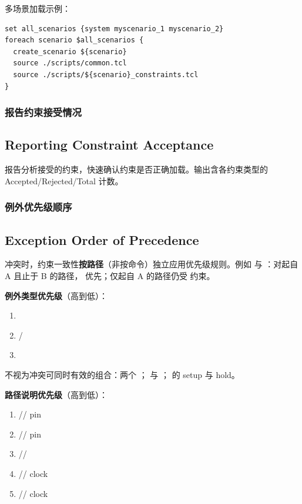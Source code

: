 多场景加载示例：
\begin{lstlisting}
set all_scenarios {system myscenario_1 myscenario_2}
foreach scenario $all_scenarios {
  create_scenario ${scenario}
  source ./scripts/common.tcl
  source ./scripts/${scenario}_constraints.tcl
}
\end{lstlisting}

\subsubsection{报告约束接受情况}
\subsection*{Reporting Constraint Acceptance}

 报告分析接受的约束，快速确认约束是否正确加载。输出含各约束类型的 Accepted/Rejected/Total 计数。

\subsubsection{例外优先级顺序}
\subsection*{Exception Order of Precedence}

冲突时，约束一致性\textbf{按路径}（非按命令）独立应用优先级规则。例如  与 ：对起自 A 且止于 B 的路径， 优先；仅起自 A 的路径仍受  约束。

\textbf{例外类型优先级}（高到低）：
\begin{enumerate}
  \item {}
  \item {} / 
  \item {}
\end{enumerate}

不视为冲突可同时有效的组合：两个 ； 与 ； 的 setup 与 hold。

\textbf{路径说明优先级}（高到低）：
\begin{enumerate}
  \item {}// pin
  \item {}// pin
  \item {}//
  \item {}// clock
  \item {}// clock
\end{enumerate}


